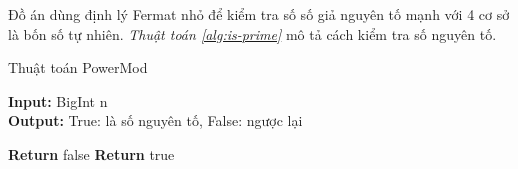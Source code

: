 Đồ án dùng định lý Fermat nhỏ để kiểm tra số số giả nguyên tố mạnh với 4 cơ sở là bốn số tự nhiên. \textit{Thuật toán \ref{alg:is-prime}} mô tả cách kiểm tra số nguyên 
tố.

\begin{algorithm}
\caption{Thuật toán PowerMod}\label{alg:is-prime}
\hspace*{\algorithmicindent} \textbf{Input:} BigInt n\\
\hspace*{\algorithmicindent} \textbf{Output:} True: là số nguyên tố, False: ngược lại 
\begin{algorithmic}[1]
\State \textbf{Return } false
\EndIf
\EndFor
\State \textbf{Return } true
\EndProcedure
\end{algorithmic}
\end{algorithm}